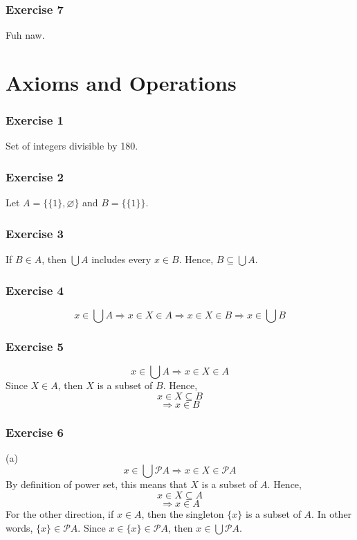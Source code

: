 \documentclass{book}
\begin{document}
\subsection*{Exercise 7}
Fuh naw.

\chapter{Axioms and Operations}

\subsection*{Exercise 1}
Set of integers divisible by 180.

\subsection*{Exercise 2}
Let $A = \{\{1\}, \varnothing\}$ and $B = \{\{1\}\}$.

\subsection*{Exercise 3}
If $B \in A$, then $\bigcup A$ includes every $x \in B$. Hence, $B \subseteq \bigcup A$.

\subsection*{Exercise 4}
$$x \in \bigcup A \Rightarrow x \in X \in A \Rightarrow x \in X \in B \Rightarrow x \in \bigcup B$$

\subsection*{Exercise 5}
$$x \in \bigcup A \Rightarrow x \in X \in A$$
Since $X \in A$, then $X$ is a subset of $B$. Hence,
$$x \in X \subseteq B$$
$$\Rightarrow x \in B$$

\subsection*{Exercise 6}
(a)
$$x \in \bigcup \mathcal{P} A \Rightarrow x \in X \in \mathcal{P} A$$
By definition of power set, this means that $X$ is a subset of $A$. Hence,
$$x \in X \subseteq A$$
$$\Rightarrow x \in A$$
For the other direction, if $x \in A$, then the singleton $\{ x \}$ is a subset of $A$. In other words, $\{ x \} \in \mathcal{P} A$. Since $x \in \{ x \} \in \mathcal{P} A$, then $x \in \bigcup \mathcal{P} A$.
\end{document}
